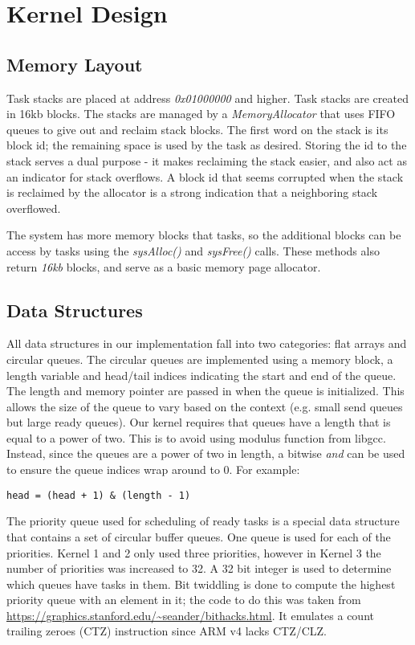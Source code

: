 \documentclass[twoside,a4paper]{refart}
\begin{document}
\section{Kernel Design}

\subsection{Memory Layout}
Task stacks are placed at address \textit{0x01000000} and higher. Task stacks are created in 16kb blocks. The stacks are managed by a \textit{MemoryAllocator} that uses FIFO queues to give out and reclaim stack blocks. The first word on the stack is its block id; the remaining space is used by the task as desired. Storing the id to the stack serves a dual purpose - it makes reclaiming the stack easier, and also act as an indicator for stack overflows. A block id that seems corrupted when the stack is reclaimed by the allocator is a strong indication that a neighboring stack overflowed.

The system has more memory blocks that tasks, so the additional blocks can be access by tasks using the \textit{sysAlloc()} and \textit{sysFree()} calls. These methods also return \textit{16kb} blocks, and serve as a basic memory page allocator.

\subsection{Data Structures}
All data structures in our implementation fall into two categories: flat arrays and circular queues. The circular queues are implemented using a memory block, a length variable and head/tail indices indicating the start and end of the queue. The length and memory pointer are passed in when the queue is initialized. This allows the size of the queue to vary based on the context (e.g. small send queues but large ready queues). Our kernel requires that queues have a length that is equal to a power of two. This is to avoid using modulus function from libgcc. Instead, since the queues are a power of two in length, a bitwise \textit{and} can be used to ensure the queue indices wrap around to 0. For example:

\begin{verbatim}
head = (head + 1) & (length - 1)
\end{verbatim}

The priority queue used for scheduling of ready tasks is a special data structure that contains a set of circular buffer queues. One queue is used for each of the priorities. Kernel 1 and 2 only used three priorities, however in Kernel 3 the number of priorities was increased to 32. A 32 bit integer is used to determine which queues have tasks in them. Bit twiddling is done to compute the highest priority queue with an element in it; the code to do this was taken from \url{https://graphics.stanford.edu/~seander/bithacks.html}. It emulates a count trailing zeroes (CTZ) instruction since ARM v4 lacks CTZ/CLZ.
\end{document}

